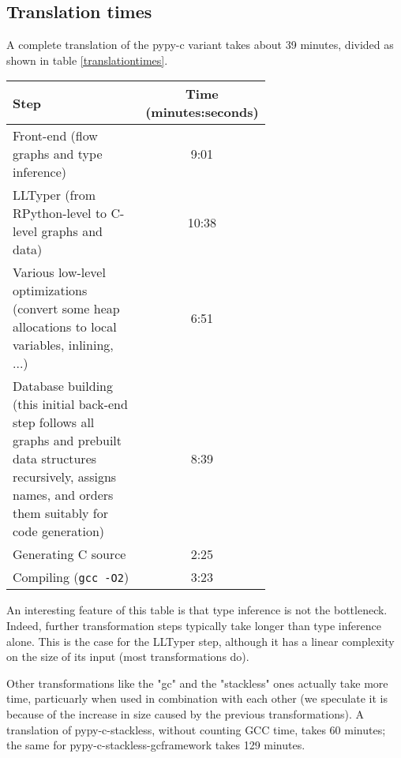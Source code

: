 \documentclass{acm_proc_article-sp}
\begin{document}
\subsection{Translation times}

A complete translation of the pypy-c variant takes about 39 minutes,
divided as shown in table \ref{translationtimes}.

\begin{table*}
\centering
\caption{Dividing overall translation time by stage}
\label{translationtimes}
\begin{tabular}{|p{0.65\linewidth}|c|} \hline
\textbf{Step} & \textbf{Time (minutes:seconds)} \\ \hline
Front-end                                 
(flow graphs and type inference)          
& 9:01 \\ \hline
LLTyper                                   
(from RPython-level to C-level graphs     
and data)                                 
& 10:38 \\ \hline
Various low-level optimizations           
(convert some heap allocations to local   
variables, inlining, ...)                 
& 6:51 \\ \hline
Database building                         
(this initial back-end step follows all   
graphs and prebuilt data structures       
recursively, assigns names, and orders    
them suitably for code generation)        
& 8:39 \\ \hline
Generating C source                       
& 2:25 \\ \hline
Compiling (\texttt{gcc -O2})              
& 3:23 \\ \hline
\end{tabular}
\end{table*}

An interesting feature of this table is that type inference is not the
bottleneck.  Indeed, further transformation steps typically take longer
than type inference alone.  This is the case for the LLTyper step,
although it has a linear complexity on the size of its input (most
transformations do).

Other transformations like the "gc" and the "stackless" ones actually
take more time, particuarly when used in combination with each other (we
speculate it is because of the increase in size caused by the previous
transformations).  A translation of pypy-c-stackless, without counting
GCC time, takes 60 minutes; the same for pypy-c-stackless-gcframework
takes 129 minutes.
\end{document}
